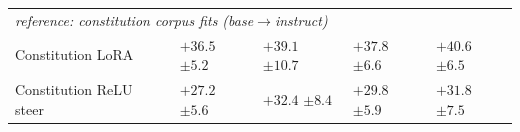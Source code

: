 \begin{table}[!htbp]
\begin{center}
{\begin{tabular}{lllll}
\multicolumn{5}{l}{\emph{reference: constitution corpus fits (base$\to$instruct)}} \\
Constitution LoRA &$+36.5$ {\scriptsize $\pm 5.2$} &$+39.1$ {\scriptsize $\pm 10.7$} &$+37.8$ {\scriptsize $\pm 6.6$} &$+40.6$ {\scriptsize $\pm 6.5$} \\
Constitution ReLU steer &$+27.2$ {\scriptsize $\pm 5.6$} &$+32.4$ {\scriptsize $\pm 8.4$} &$+29.8$ {\scriptsize $\pm 5.9$} &$+31.8$ {\scriptsize $\pm 7.5$} \\
\end{tabular}}
\end{center}
\end{table}
